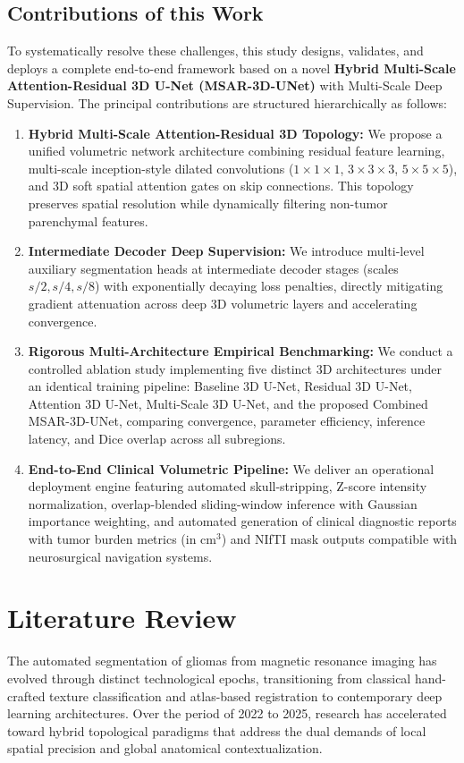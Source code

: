 \documentclass[conference]{IEEEtran}
\begin{document}
\subsection{Contributions of this Work}
To systematically resolve these challenges, this study designs, validates, and deploys a complete end-to-end framework based on a novel \textbf{Hybrid Multi-Scale Attention-Residual 3D U-Net (MSAR-3D-UNet)} with Multi-Scale Deep Supervision. The principal contributions are structured hierarchically as follows:
\begin{enumerate}
    \item \textbf{Hybrid Multi-Scale Attention-Residual 3D Topology:} We propose a unified volumetric network architecture combining residual feature learning, multi-scale inception-style dilated convolutions ($1\times 1\times 1$, $3\times 3\times 3$, $5\times 5\times 5$), and 3D soft spatial attention gates on skip connections. This topology preserves spatial resolution while dynamically filtering non-tumor parenchymal features.
    \item \textbf{Intermediate Decoder Deep Supervision:} We introduce multi-level auxiliary segmentation heads at intermediate decoder stages (scales $s/2, s/4, s/8$) with exponentially decaying loss penalties, directly mitigating gradient attenuation across deep 3D volumetric layers and accelerating convergence.
    \item \textbf{Rigorous Multi-Architecture Empirical Benchmarking:} We conduct a controlled ablation study implementing five distinct 3D architectures under an identical training pipeline: Baseline 3D U-Net, Residual 3D U-Net, Attention 3D U-Net, Multi-Scale 3D U-Net, and the proposed Combined MSAR-3D-UNet, comparing convergence, parameter efficiency, inference latency, and Dice overlap across all subregions.
    \item \textbf{End-to-End Clinical Volumetric Pipeline:} We deliver an operational deployment engine featuring automated skull-stripping, Z-score intensity normalization, overlap-blended sliding-window inference with Gaussian importance weighting, and automated generation of clinical diagnostic reports with tumor burden metrics (in cm$^3$) and NIfTI mask outputs compatible with neurosurgical navigation systems.
\end{enumerate}

\section{Literature Review}
The automated segmentation of gliomas from magnetic resonance imaging has evolved through distinct technological epochs, transitioning from classical hand-crafted texture classification and atlas-based registration to contemporary deep learning architectures. Over the period of 2022 to 2025, research has accelerated toward hybrid topological paradigms that address the dual demands of local spatial precision and global anatomical contextualization.
\end{document}
